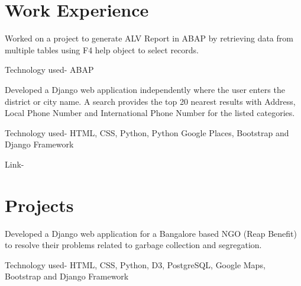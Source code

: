 \documentclass[]{resume-openfont}
\begin{document}
\begin{minipage}[t]{0.68\textwidth} 


\section{Work Experience}

Worked on a project to generate ALV Report in ABAP by retrieving data from multiple tables using F4 help object to select records.
\vspace{\topsep} %
\begin{tightemize}
\item Technology used- ABAP
\end{tightemize}
\sectionsep

Developed a Django web application independently where the user enters the district or city name. A search provides the top 20 nearest results with Address, Local Phone Number and International Phone Number for the listed categories. 
\begin{tightemize}
\item Technology used- HTML, CSS, Python, Python Google Places, Bootstrap and Django Framework
\item Link- \href{https://find-my-perfect-place.herokuapp.com/}{}
\end{tightemize}

\sectionsep


\section{Projects}

\sectionsep

Developed a Django web application for a Bangalore based NGO (Reap Benefit) to resolve their problems related to garbage collection and segregation. \\
\begin{tightemize}
\item Technology used- HTML, CSS, Python, D3, PostgreSQL, Google Maps, Bootstrap and Django Framework
\end{tightemize}
\sectionsep


\end{minipage}
\end{document}
